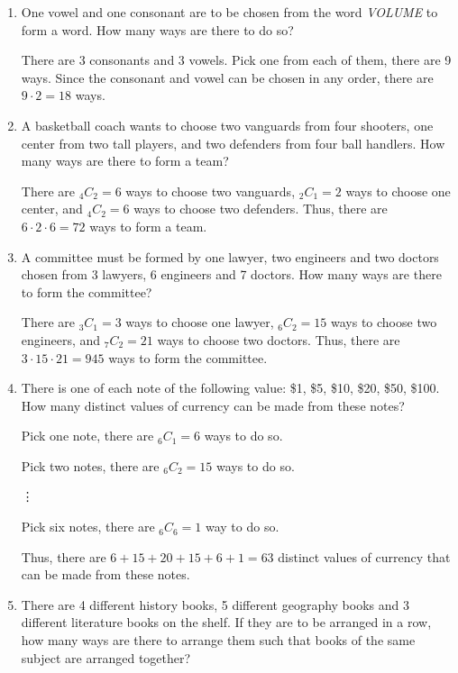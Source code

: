 \documentclass{report}
\newcommand\comb[2][^n]{{}_{#1}C_{#2}}
\begin{document}
\begin{multicols}{2}
\begin{enumerate}
    \item One vowel and one consonant are to be chosen from the word \textit{VOLUME} to
          form a word. How many ways are there to do so? \sol{}

          There are 3 consonants and 3 vowels. Pick one from each of them, there are 9
          ways. Since the consonant and vowel can be chosen in any order, there are $9
            \cdot 2 = 18$ ways.

    \item A basketball coach wants to choose two vanguards from four shooters, one center
          from two tall players, and two defenders from four ball handlers. How many ways
          are there to form a team? \sol{}

          There are $\comb[4]{2} = 6$ ways to choose two vanguards, $\comb[2]{1} = 2$
          ways to choose one center, and $\comb[4]{2} = 6$ ways to choose two defenders.
          Thus, there are $6 \cdot 2 \cdot 6 = 72$ ways to form a team.

    \item A committee must be formed by one lawyer, two engineers and two doctors chosen
          from 3 lawyers, 6 engineers and 7 doctors. How many ways are there to form the
          committee? \sol{}

          There are $\comb[3]{1} = 3$ ways to choose one lawyer, $\comb[6]{2} = 15$ ways
          to choose two engineers, and $\comb[7]{2} = 21$ ways to choose two doctors.
          Thus, there are $3 \cdot 15 \cdot 21 = 945$ ways to form the committee.

    \item  There is one of each note of the following value: \$1, \$5, \$10, \$20, \$50,
          \$100. How many distinct values of currency can be made from these notes?

          \sol{}

          Pick one note, there are $\comb[6]{1} = 6$ ways to do so.

          Pick two notes, there are $\comb[6]{2} = 15$ ways to do so.

          \vdots

          Pick six notes, there are $\comb[6]{6} = 1$ way to do so.

          Thus, there are $6 + 15 + 20 + 15 + 6 + 1 = 63$ distinct values of currency
          that can be made from these notes.

    \item There are 4 different history books, 5 different geography books and 3
          different literature books on the shelf. If they are to be arranged in a row,
          how many ways are there to arrange them such that books of the same subject are
          arranged together?


\end{enumerate}
\end{multicols}
\end{document}
